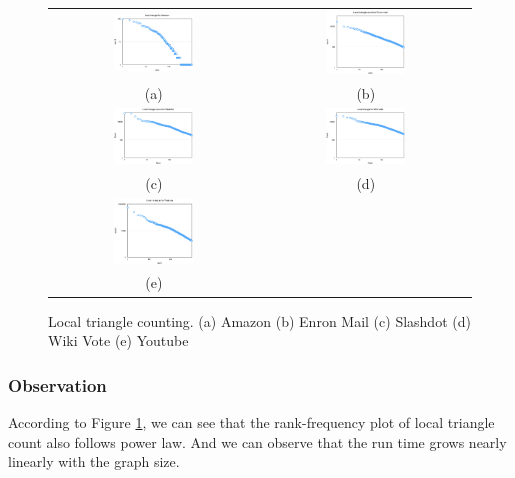 \begin{figure}[h]
\begin{center}
\begin{tabular}{cc}
     \includegraphics[width=0.4\textwidth]{FIG/t7_amazon.png} &
     \includegraphics[width=0.4\textwidth]{FIG/t7_enron.png} \\
     (a) & (b) \\
     \includegraphics[width=0.4\textwidth]{FIG/t7_slashdot.png} &
     \includegraphics[width=0.4\textwidth]{FIG/t7_wikivote.png} \\
     (c) & (d) \\
     \includegraphics[width=0.4\textwidth]{FIG/t7_youtube.png} & \\
     (e)
\end{tabular}
\caption{Local triangle counting. (a) Amazon (b) Enron Mail (c) Slashdot (d) Wiki Vote (e) Youtube}
\label{t7:local}
\end{center}
\end{figure}

\subsubsection{Observation}
According to Figure \ref{t7:local}, we can see that the rank-frequency plot of local triangle count also follows power law. And we can observe that the run time grows nearly linearly with the graph size. 
